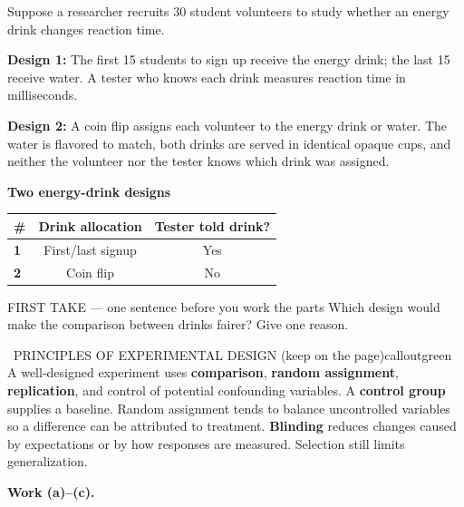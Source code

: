 \documentclass[11pt]{article}
\begin{document}


Suppose a researcher recruits 30 student volunteers to study whether an energy drink changes reaction time.\par\smallskip \textbf{Design 1:} The first 15 students to sign up receive the energy drink; the last 15 receive water. A tester who knows each drink measures reaction time in milliseconds.\par \textbf{Design 2:} A coin flip assigns each volunteer to the energy drink or water. The water is flavored to match, both drinks are served in identical opaque cups, and neither the volunteer nor the tester knows which drink was assigned.\par
\begin{center}
\textbf{Two energy-drink designs}\par\smallskip
\begin{tabular}{|l|c|c|}
\hline
\textbf{\#} & \textbf{Drink allocation} & \textbf{Tester told drink?} \\ \hline
\textbf{1} & First/last signup & Yes \\ \hline
\textbf{2} & Coin flip & No \\ \hline
\end{tabular}
\end{center}
\begin{firsttakebox}{FIRST TAKE --- one sentence before you work the parts}
Which design would make the comparison between drinks fairer? Give one reason.
\workspace{0.9in}
\end{firsttakebox}

\begin{callout}{\IconBook\ PRINCIPLES OF EXPERIMENTAL DESIGN (keep on the page)}{calloutgreen}
A well-designed experiment uses \textbf{comparison}, \textbf{random assignment}, \textbf{replication}, and
control of potential confounding variables. A \textbf{control group} supplies a baseline. Random assignment
tends to balance uncontrolled variables so a difference can be attributed to treatment. \textbf{Blinding}
reduces changes caused by expectations or by how responses are measured. Selection still limits generalization.
\end{callout}

\newpage
\textbf{Work (a)--(c).}\par\smallskip
\end{document}
